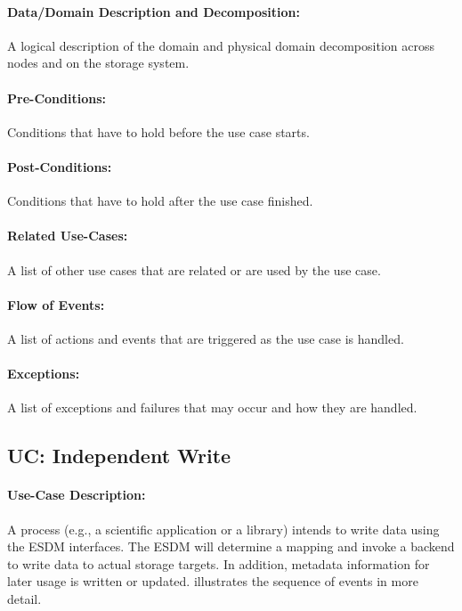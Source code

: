 \paragraph{Data/Domain Description and Decomposition:} A logical description of the domain and physical domain decomposition across nodes and on the storage system.

\paragraph{Pre-Conditions:} Conditions that have to hold before the use case starts.

\paragraph{Post-Conditions:} Conditions that have to hold after the use case finished.

\paragraph{Related Use-Cases:} A list of other use cases that are related or are used by the use case.

\paragraph{Flow of Events:} A list of actions and events that are triggered as the use case is handled.

\paragraph{Exceptions:} A list of exceptions and failures that may occur and how they are handled.



\subsection{UC: Independent Write}
\label{uc: independent write}

\paragraph{Use-Case Description:}
A process (e.g., a scientific application or a library) intends to write data using the ESDM interfaces.
The ESDM will determine a mapping and invoke a backend to write data to actual storage targets.
In addition, metadata information for later usage is written or updated.
 illustrates the sequence of events in more detail.


